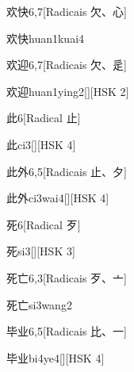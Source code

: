 \begin{entry}{欢快}{6,7}[Radicais ⽋、⼼]
  \begin{phonetics}{欢快}{huan1kuai4}
  \end{phonetics}
\end{entry}

\begin{entry}{欢迎}{6,7}[Radicais ⽋、⾡]
  \begin{phonetics}{欢迎}{huan1ying2}[][HSK 2]
  \end{phonetics}
\end{entry}

\begin{entry}{此}{6}[Radical ⽌]
  \begin{phonetics}{此}{ci3}[][HSK 4]
  \end{phonetics}
\end{entry}

\begin{entry}{此外}{6,5}[Radicais ⽌、⼣]
  \begin{phonetics}{此外}{ci3wai4}[][HSK 4]
  \end{phonetics}
\end{entry}

\begin{entry}{死}{6}[Radical ⽍]
  \begin{phonetics}{死}{si3}[][HSK 3]
  \end{phonetics}
\end{entry}

\begin{entry}{死亡}{6,3}[Radicais ⽍、⼇]
  \begin{phonetics}{死亡}{si3wang2}
  \end{phonetics}
\end{entry}

\begin{entry}{毕业}{6,5}[Radicais ⽐、⼀]
  \begin{phonetics}{毕业}{bi4ye4}[][HSK 4]
  \end{phonetics}
\end{entry}


